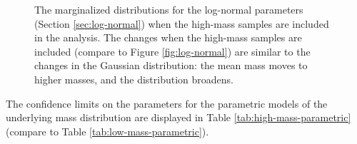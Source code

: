 \documentclass[preprint]{aastex}
\begin{document}
\begin{figure}
  \begin{center}
  \end{center}
  \caption{\label{fig:log-normal-high} The marginalized distributions
    for the log-normal parameters (Section \ref{sec:log-normal}) when
    the high-mass samples are included in the analysis.  The changes
    when the high-mass samples are included (compare to Figure
    \ref{fig:log-normal}) are similar to the changes in the Gaussian
    distribution: the mean mass moves to higher masses, and the
    distribution broadens.}
\end{figure}

The confidence limits on the parameters for the parametric models of
the underlying mass distribution are displayed in Table
\ref{tab:high-mass-parametric} (compare to Table
\ref{tab:low-mass-parametric}).
\end{document}
